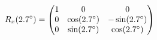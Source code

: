 \documentclass[preview]{standalone}
\begin{document}
\begin{align*}
\special{dvisvgm:raw <g id='unique000'>}R_x(2.7^\circ) = \begin{pmatrix} 1 & 0 & 0 \\ 0 & \cos(2.7^\circ) & -\sin(2.7^\circ) \\ 0 & \sin(2.7^\circ) & \cos(2.7^\circ) \end{pmatrix}\special{dvisvgm:raw </g>}
\end{align*}
\end{document}
